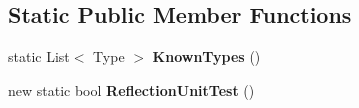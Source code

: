 \subsection*{Static Public Member Functions}
\begin{DoxyCompactItemize}
\item 
\hypertarget{class_s_e_mod_a_p_i_internal_1_1_a_p_i_1_1_entity_1_1_sector_1_1_sector_object_1_1_cube_grid_entity_a03b8d2a525c9f2ca0035642773585c95}{}static List$<$ Type $>$ {\bfseries Known\+Types} ()\label{class_s_e_mod_a_p_i_internal_1_1_a_p_i_1_1_entity_1_1_sector_1_1_sector_object_1_1_cube_grid_entity_a03b8d2a525c9f2ca0035642773585c95}

\item 
\hypertarget{class_s_e_mod_a_p_i_internal_1_1_a_p_i_1_1_entity_1_1_sector_1_1_sector_object_1_1_cube_grid_entity_a4160c4a384f055d6fc92aa16acc2bce4}{}new static bool {\bfseries Reflection\+Unit\+Test} ()\label{class_s_e_mod_a_p_i_internal_1_1_a_p_i_1_1_entity_1_1_sector_1_1_sector_object_1_1_cube_grid_entity_a4160c4a384f055d6fc92aa16acc2bce4}

\end{DoxyCompactItemize}

